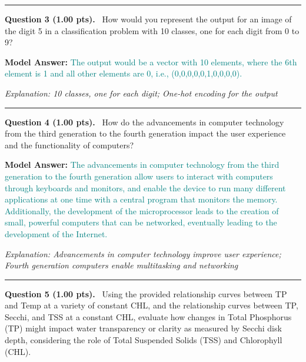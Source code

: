 \documentclass[12pt,a4paper]{article}
\begin{document}
\vspace{0.8em}
\noindent\rule{\linewidth}{0.2pt}
\vspace{0.3em}


\noindent
\textbf{Question 3 (1.00 pts).}~
How would you represent the output for an image of the digit 5 in a classification problem with 10 classes, one for each digit from 0 to 9?


\textbf{Model Answer:} \textcolor{teal}{The output would be a vector with 10 elements, where the 6th element is 1 and all other elements are 0, i.e., (0,0,0,0,0,1,0,0,0,0).}



\textit{\small Explanation: 10 classes, one for each digit; One-hot encoding for the output}



\vspace{0.8em}
\noindent\rule{\linewidth}{0.2pt}
\vspace{0.3em}


\noindent
\textbf{Question 4 (1.00 pts).}~
How do the advancements in computer technology from the third generation to the fourth generation impact the user experience and the functionality of computers?


\textbf{Model Answer:} \textcolor{teal}{The advancements in computer technology from the third generation to the fourth generation allow users to interact with computers through keyboards and monitors, and enable the device to run many different applications at one time with a central program that monitors the memory. Additionally, the development of the microprocessor leads to the creation of small, powerful computers that can be networked, eventually leading to the development of the Internet.}



\textit{\small Explanation: Advancements in computer technology improve user experience; Fourth generation computers enable multitasking and networking}



\vspace{0.8em}
\noindent\rule{\linewidth}{0.2pt}
\vspace{0.3em}


\noindent
\textbf{Question 5 (1.00 pts).}~
Using the provided relationship curves between TP and Temp at a variety of constant CHL, and the relationship curves between TP, Secchi, and TSS at a constant CHL, evaluate how changes in Total Phosphorus (TP) might impact water transparency or clarity as measured by Secchi disk depth, considering the role of Total Suspended Solids (TSS) and Chlorophyll (CHL).
\end{document}
